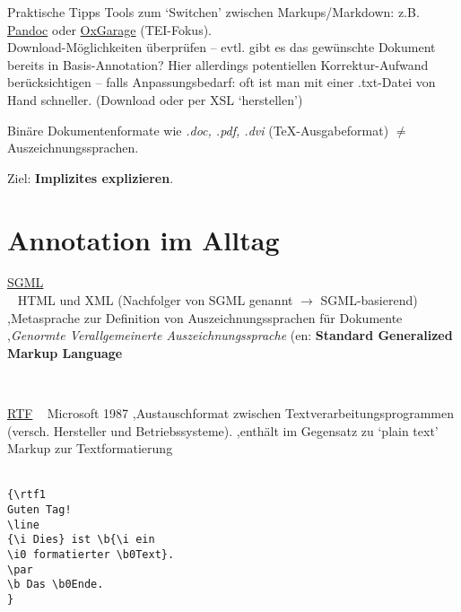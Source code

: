  \begin{frame}[allowframebreaks]{Praktische Tipps}
 Tools zum `Switchen' zwischen Markups/Markdown: 
 z.B.~ \href{https://pandoc.org/}{Pandoc} oder \href{http://oxgarage.tei-c.org/#}{OxGarage} (TEI-Fokus). \\
 \footnotesize
 Download-Möglichkeiten überprüfen -- evtl. gibt es das gewünschte Dokument bereits in Basis-Annotation? Hier allerdings potentiellen Korrektur-Aufwand berücksichtigen -- falls Anpassungsbedarf: oft ist man mit einer .txt-Datei von Hand schneller. (Download oder per XSL `herstellen')
 


Binäre Dokumentenformate  wie \emph{.doc, .pdf, .dvi} (\TeX{}-Ausgabeformat) $\neq$ Auszeichnungssprachen.

Ziel: \textbf{Implizites explizieren}.
\end{frame}




\section{Annotation im Alltag}
\begin{frame}[allowframebreaks]{\href{https://de.wikipedia.org/wiki/Standard_Generalized_Markup_Language}{SGML}}
\\
 ~
HTML und XML (Nachfolger von SGML genannt $\to$  SGML-basierend) \sep Metasprache zur Definition von Auszeichnungssprachen für Dokumente \sep \emph{Genormte Verallgemeinerte Auszeichnungssprache} (en: \textbf{Standard Generalized Markup Language}

\\
\end{frame}





\begin{frame}{\href{https://de.wikipedia.org/wiki/Rich_Text_Format}{RTF}}
~
Microsoft 1987 \sep Austauschformat zwischen Textverarbeitungsprogrammen (versch. Hersteller und Betriebssysteme). \sep enthält im Gegensatz zu `plain text' Markup zur Textformatierung\\

\\
\footnotesize
\begin{verbatim}
{\rtf1
Guten Tag!
\line
{\i Dies} ist \b{\i ein
\i0 formatierter \b0Text}.
\par
\b Das \b0Ende.
} 
\end{verbatim}\normalsize

\end{frame}

